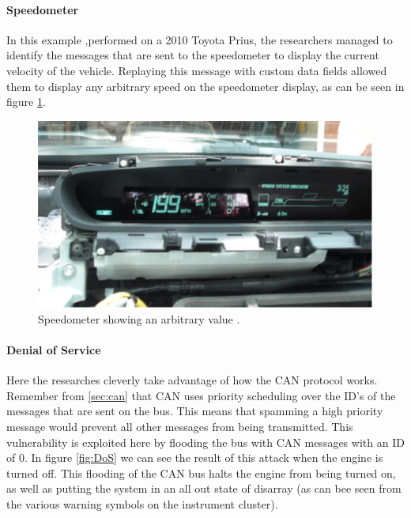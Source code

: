 \documentclass[master=cws,masteroption=vs,english]{kulemt}
\begin{document}
\paragraph{Speedometer} In this example ,performed on a 2010 Toyota Prius, the researchers managed to identify the messages that are sent to the speedometer to display the current velocity of the vehicle. Replaying this message with custom data fields allowed them to display any arbitrary speed on the speedometer display, as can be seen in figure \ref{fig:speedometer}.

\begin{figure}[h]
	\label{fig:speedometer}
	\centering
	\includegraphics[width=\textwidth]{speedometer.png}
	\caption{Speedometer showing an arbitrary value \cite{MillerC}.}
\end{figure}

\paragraph{Denial of Service} Here the researches cleverly take advantage of how the CAN protocol works. Remember from \ref{sec:can} that CAN uses priority scheduling over the ID's of the messages that are sent on the bus. This means that spamming a high priority message would prevent all other messages from being transmitted. This vulnerability is exploited here by flooding the bus with CAN messages with an ID of 0. In figure \ref{fig:DoS} we can see the result of this attack when the engine is turned off. This flooding of the CAN bus halts the engine from being turned on, as well as putting the system in an all out state of disarray (as can bee seen from the various warning symbols on the instrument cluster).
 
\end{document}
